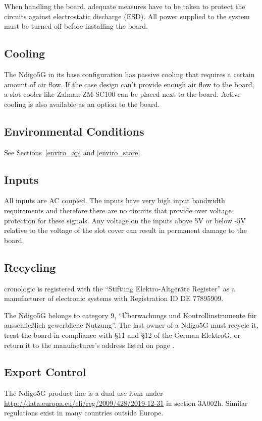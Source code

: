 	When handling the board, adequate measures have to be taken to protect the circuits against electrostatic discharge (ESD). All power supplied to the system must be turned off before installing the board.

\subsection{Cooling}

	The Ndigo5G in its base configuration has passive cooling that requires a certain amount of air flow. If the case design can't provide enough air flow to the board, a slot cooler like Zalman ZM-SC100 can be placed next to the board. Active cooling is also available as an option to the board.

\subsection{Environmental Conditions}
	See Sections~\ref{enviro_op} and \ref{enviro_store}.

\subsection{Inputs}

	All inputs are AC coupled. The inputs have very high input bandwidth requirements and therefore there are no circuits that provide over voltage protection for these signals. Any voltage on the inputs above 5V or below -5V relative to the voltage of the slot cover can result in permanent damage to the board.

\subsection{Recycling}

	cronologic is registered with the ``Stiftung Elektro-Altger\"a{}te Register'' as a manufacturer of electronic systems with Registration ID DE 77895909.\par

	The Ndigo5G belongs to category 9, ``\"U{}berwachungs und Kontrollinstrumente f\"u{}r aus\-schlie\ss lich gewerbliche Nutzung''. The last owner of a Ndigo5G must recycle it, treat the board in compliance with \S{}11 and \S{}12 of the German ElektroG, or return it to the manufacturer's address listed on page \pageref{cp:manu}.
	
\subsection{Export Control}
The Ndigo5G product line is a dual use item under \href{Council Regulation (EC) No 428/2009 of 5 May 2009 setting up a Community regime for the control of exports, transfer, brokering and transit of dual-use items}{http://data.europa.eu/eli/reg/2009/428/2019-12-31} in section 3A002h. Similar regulations exist in many countries outside Europe.

